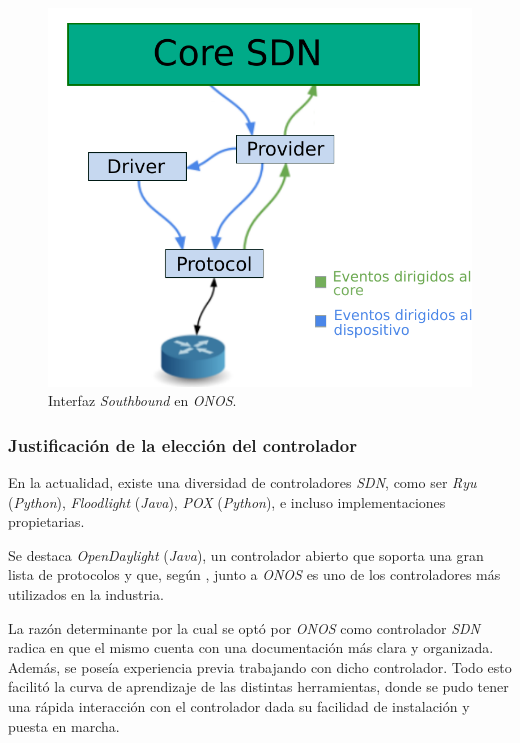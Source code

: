 \begin{figure}[H]
	\centering
	\includegraphics[scale=0.67]{Figures/southboundonos.pdf}
	\caption{Interfaz \textit{Southbound} en \textit{ONOS}.}
	\label{fig:onosarchsouth}
  \end{figure}

  \subsubsection{Justificación de la elección del controlador}

En la actualidad, existe una diversidad de controladores \textit{SDN}, como ser \textit{Ryu} (\textit{Python}), \textit{Floodlight} (\textit{Java}), \textit{POX} (\textit{Python}), e incluso implementaciones propietarias. 

Se destaca \textit{OpenDaylight} (\textit{Java}), un controlador abierto que soporta una gran lista de protocolos y que, según \parencite{book_SDN_a_c_a}, junto a \textit{ONOS} es uno de los controladores más utilizados en la industria.

La razón determinante por la cual se optó por \textit{ONOS} como controlador \textit{SDN} radica en que el mismo cuenta con una documentación más clara y organizada. Además, se poseía experiencia previa trabajando con dicho controlador. Todo esto facilitó la curva de aprendizaje de las distintas herramientas, donde se pudo tener una rápida interacción con el controlador dada su facilidad de instalación y puesta en marcha.

